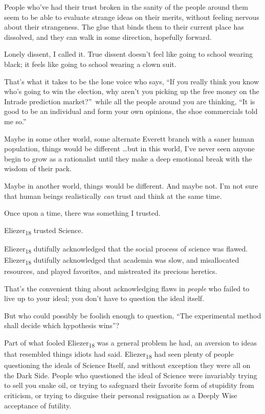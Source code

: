 {
 People who've had their trust broken in the sanity
of the people around them seem to be able to evaluate strange ideas on
their merits, without feeling nervous about their strangeness. The glue
that binds them to their current place has dissolved, and they can walk
in some direction, hopefully forward.}

{
 Lonely dissent, I called it. True dissent doesn't
feel like going to school wearing black; it feels like going to school
wearing a clown suit.}

{
 That's what it takes to be the lone voice who
says, ``If you really think you know
who's going to win the election, why
aren't you picking up the free money on the Intrade
prediction market?''~while all the people around you
are thinking, ``It is good to be an individual and
form your own opinions, the shoe commercials told me
so.''}

{
 Maybe in some other world, some alternate Everett branch with a
saner human population, things would be different \ldots but in this
world, I've never seen anyone begin to grow as a
rationalist until they make a deep emotional break with the wisdom of
their pack.}

{
 Maybe in another world, things would be different. And maybe not.
I'm not sure that human beings realistically
\textit{can} trust and think at the same time.}

{
 Once upon a time, there was something I trusted.}

{
 Eliezer\textsubscript{18} trusted Science.}

{
 Eliezer\textsubscript{18} dutifully acknowledged that the social
process of science was flawed. Eliezer\textsubscript{18} dutifully
acknowledged that academia was slow, and misallocated resources, and
played favorites, and mistreated its precious heretics.}

{
 That's the convenient thing about acknowledging
flaws in \textit{people} who failed to live up to your ideal; you
don't have to question the ideal itself.}

{
 But who could possibly be foolish enough to question,
``The experimental method shall decide which
hypothesis wins''?}

{
 Part of what fooled Eliezer\textsubscript{18} was a general
problem he had, an aversion to ideas that resembled things idiots had
said. Eliezer\textsubscript{18} had seen plenty of people questioning
the ideals of Science Itself, and without exception they were all on
the Dark Side. People who questioned the ideal of Science were
invariably trying to sell you snake oil, or trying to safeguard their
favorite form of stupidity from criticism, or trying to disguise their
personal resignation as a Deeply Wise acceptance of futility.}


